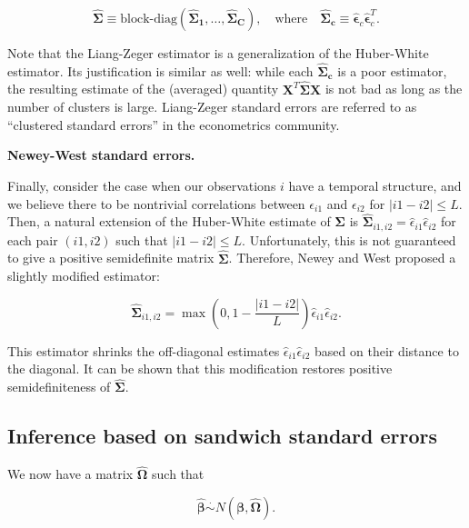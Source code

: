 \documentclass[
  11pt,
  letterpaper,
  oneside]{book}
\theoremstyle{definition}
\theoremstyle{plain}
\theoremstyle{plain}
\theoremstyle{plain}
\theoremstyle{remark}
\begin{document}
\[
\boldsymbol{\widehat{\Sigma}} \equiv \text{block-diag}(\boldsymbol{\widehat{\Sigma}_1}, \dots, \boldsymbol{\widehat{\Sigma}_C}), \quad \text{where} \quad  \boldsymbol{\widehat{\Sigma}_c} \equiv \boldsymbol{\widehat{\epsilon}}_c \boldsymbol{\widehat{\epsilon}}_c^T.
\]

Note that the Liang-Zeger estimator is a generalization of the
Huber-White estimator. Its justification is similar as well: while each
\(\boldsymbol{\widehat{\Sigma}_c}\) is a poor estimator, the resulting
estimate of the (averaged) quantity
\(\boldsymbol{X}^T \boldsymbol{\widehat{\Sigma}}\boldsymbol{X}\) is not
bad as long as the number of clusters is large. Liang-Zeger standard
errors are referred to as ``clustered standard errors'' in the
econometrics community.

\textbf{Newey-West standard errors.}

Finally, consider the case when our observations \(i\) have a temporal
structure, and we believe there to be nontrivial correlations between
\(\epsilon_{i1}\) and \(\epsilon_{i2}\) for \(|i1 - i2| \leq L\). Then,
a natural extension of the Huber-White estimate of
\(\boldsymbol{\Sigma}\) is
\(\boldsymbol{\widehat{\Sigma}}_{i1,i2} = \widehat{\epsilon}_{i1}\widehat{\epsilon}_{i2}\)
for each pair \((i1, i2)\) such that \(|i1 - i2| \leq L\).
Unfortunately, this is not guaranteed to give a positive semidefinite
matrix \(\boldsymbol{\widehat{\Sigma}}\). Therefore, Newey and West
proposed a slightly modified estimator:

\[
\boldsymbol{\widehat{\Sigma}}_{i1,i2} = \max\left(0, 1-\frac{|i1-i2|}{L}\right)\widehat{\epsilon}_{i1}\widehat{\epsilon}_{i2}.
\]

This estimator shrinks the off-diagonal estimates
\(\widehat{\epsilon}_{i1}\widehat{\epsilon}_{i2}\) based on their
distance to the diagonal. It can be shown that this modification
restores positive semidefiniteness of \(\boldsymbol{\widehat{\Sigma}}\).

\hypertarget{sec-sandwich-inference}{%
\subsection{Inference based on sandwich standard
errors}\label{sec-sandwich-inference}}

We now have a matrix \(\widehat{\boldsymbol{\Omega}}\) such that

\[
\boldsymbol{\widehat{\beta}} \overset{\cdot}{\sim} N(\boldsymbol{\beta}, \widehat{\boldsymbol{\Omega}}).
\]
\end{document}
